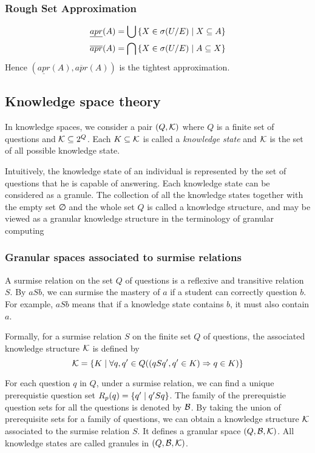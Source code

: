 \documentclass[11pt]{article}
\begin{document}
\subsubsection{Rough Set Approximation}
\label{sec:org4eb4cbd}
\begin{align*}
  &\underline{apr}(A)=\bigcup\left\{ X\in\sigma(U/E)\mid X\subseteq A\right\}\\
  &\overline{apr}(A)=\bigcap\left\{ X\in\sigma(U/E)\mid A\subseteq X\right\}\\
\end{align*}
Hence \((\underline{apr}(A),\overline{apr}(A))\) is the tightest approximation.
\subsection{Knowledge space theory}
\label{sec:org855ece0}
In knowledge spaces, we consider a pair \((Q,\mathcal{K})\) where \(Q\) is a finite set
of questions and \(\mathcal{K}\subseteq 2^Q\). Each \(K\subseteq\mathcal{K}\) is called a
\emph{knowledge state} and \(\mathcal{K}\) is the set of all possible knowledge state.


Intuitively, the knowledge state of an individual is represented by the set
of questions that he is capable of answering. Each knowledge state can be
considered as a granule. The collection of all the knowledge states together
with the empty set ∅ and the whole set \(Q\) is called a knowledge structure, and
may be viewed as a granular knowledge structure in the terminology of
granular computing 
\subsubsection{Granular spaces associated to surmise relations}
\label{sec:org38b14a1}
A surmise relation on the set \(Q\) of questions is a reflexive and transitive
relation \(S\). By \(aSb\), we can surmise the mastery of \(a\) if a student can
correctly question \(b\). For example, \(aSb\) means that if a knowledge state
contains \(b\), it must also contain \(a\).

Formally, for a surmise relation \(S\) on the finite set \(Q\) of questions, the
associated knowledge structure \(\mathcal{K}\) is defined by
\begin{equation*}
\mathcal{K}=\left\{ K\mid\forall q,q'\in Q((qSq',q'\in K)\Rightarrow q\in K)\right\}
\end{equation*}

For each question \(q\) in \(Q\), under a surmise relation, we can find a unique
prerequistie question set \(R_p(q)=\left\{ q'\mid q'Sq\right\}\). The family of the
prerequistie question sets for all the questions is denoted by \(\mathcal{B}\). By taking
the union of prerequisite sets for a family of questions, we can obtain a
knowledge structure \(\mathcal{K}\) associated to the surmise relation \(S\). It
defines a granular space \((Q,\mathcal{B},\mathcal{K})\). All knowledge states are called
granules in \((Q,\mathcal{B},\mathcal{K})\). 
\end{document}
